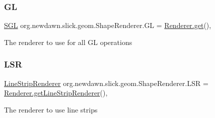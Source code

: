 \subsubsection{\texorpdfstring{GL}{GL}}
{\footnotesize\ttfamily \mbox{\hyperlink{interfaceorg_1_1newdawn_1_1slick_1_1opengl_1_1renderer_1_1_s_g_l}{S\+GL}} org.\+newdawn.\+slick.\+geom.\+Shape\+Renderer.\+GL = \mbox{\hyperlink{classorg_1_1newdawn_1_1slick_1_1opengl_1_1renderer_1_1_renderer_abe742c3a7dfca67c6c01821d27087308}{Renderer.\+get}}()\hspace{0.3cm}{\ttfamily [static]}, {\ttfamily [private]}}

The renderer to use for all GL operations \mbox{\label{classorg_1_1newdawn_1_1slick_1_1geom_1_1_shape_renderer_a921cd2a9f7573ae41fa8b4830aa85c36}} 
\subsubsection{\texorpdfstring{L\+SR}{LSR}}
{\footnotesize\ttfamily \mbox{\hyperlink{interfaceorg_1_1newdawn_1_1slick_1_1opengl_1_1renderer_1_1_line_strip_renderer}{Line\+Strip\+Renderer}} org.\+newdawn.\+slick.\+geom.\+Shape\+Renderer.\+L\+SR = \mbox{\hyperlink{classorg_1_1newdawn_1_1slick_1_1opengl_1_1renderer_1_1_renderer_a8e231c62dce8d884fd0b26beed63e743}{Renderer.\+get\+Line\+Strip\+Renderer}}()\hspace{0.3cm}{\ttfamily [static]}, {\ttfamily [private]}}

The renderer to use line strips 